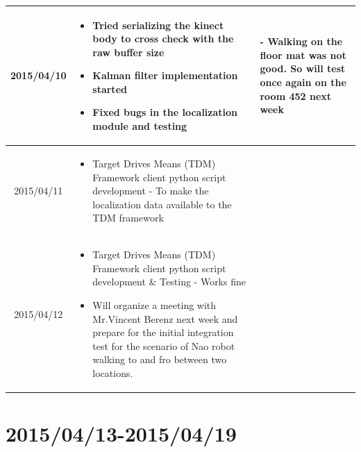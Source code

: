 \documentclass[11pt]{article} %
\begin{document}
\begin{center}
\begin{longtable}{ | c | p{6cm} | p{5cm} |}
  2015/04/10         & 
  \begin{itemize}
  \item Tried serializing the kinect body to cross check with the raw buffer size
  \item Kalman filter implementation started
  \item Fixed bugs in the localization module and testing
\end{itemize}   
  & 
  - Walking on the floor mat was not good. So will test once again on the room 452 next week
\\
  										 \hline
  										 
	 2015/04/11         & 
  \begin{itemize}
  \item Target Drives Means (TDM) Framework client python script development - To make the localization data available to the TDM framework
\end{itemize}   
  & 
		\\					 \hline  	

	 2015/04/12         & 
  \begin{itemize}
  \item Target Drives Means (TDM) Framework client python script development \& Testing - Works fine
  \item Will organize a meeting with Mr.Vincent Berenz next week and prepare for the initial integration test for the scenario of Nao robot walking to and fro between two locations.
\end{itemize}   
  & 
		\\					 \hline  	
										 
  										   								 
    \end{longtable}
\end{center}

\newpage
\section{2015/04/13-2015/04/19}
\end{document}

